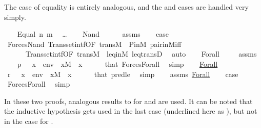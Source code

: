The case of equality is entirely analogous, and the  and
 cases are handled very simply.
%
\begin{isabelle}
\isamarkupfalse%
\isanewline
\ \ \isamarkupfalse%
\ {\isacharparenleft}Equal\ n\ m{\isacharparenright}\isanewline
\ \ \dots\isanewline
{}\isamarkupfalse%
\isanewline
\ \ \isamarkupfalse%
\ {\isacharparenleft}Nand\ {\isasymphi}\ {\isasympsi}{\isacharparenright}\isanewline
\ \ \isamarkupfalse%
\ assms\isanewline
\ \ \isamarkupfalse%
\ {\isacharquery}case\ \isanewline
\ \ \ \ \isamarkupfalse%
\ Forces{\isacharunderscore}Nand\ Transset{\isacharunderscore}intf{\isacharbrackleft}OF\ trans{\isacharunderscore}M\ {\isacharunderscore}\ P{\isacharunderscore}in{\isacharunderscore}M{\isacharbrackright}\ pair{\isacharunderscore}in{\isacharunderscore}M{\isacharunderscore}iff\isanewline
\ \ \ \ \ \ Transset{\isacharunderscore}intf{\isacharbrackleft}OF\ trans{\isacharunderscore}M\ {\isacharunderscore}\ leq{\isacharunderscore}in{\isacharunderscore}M{\isacharbrackright}\ leq{\isacharunderscore}transD\ \isamarkupfalse%
\ auto\isanewline
{}\isamarkupfalse%
\isanewline
\ \ \isamarkupfalse%
\ {\isacharparenleft}Forall\ {\isasymphi}{\isacharparenright}\isanewline
\ \ \isamarkupfalse%
\ assms\isanewline
\ \ \isamarkupfalse%
\ {\isachardoublequoteopen}p\ {\isasymtturnstile}\ {\isasymphi}\ {\isacharparenleft}{\isacharbrackleft}x{\isacharbrackright}\ {\isacharat}\ env{\isacharparenright}{\isachardoublequoteclose}\ \ {\isachardoublequoteopen}x{\isasymin}M{\isachardoublequoteclose}\ \ x\isanewline
\ \ \ \ \isamarkupfalse%
\ that\ Forces{\isacharunderscore}Forall\ \isamarkupfalse%
\ simp\isanewline
\ \ \isamarkupfalse%
\ \underline{Forall}\ \isanewline
\ \ \isamarkupfalse%
\ {\isachardoublequoteopen}r\ {\isasymtturnstile}\ {\isasymphi}\ {\isacharparenleft}{\isacharbrackleft}x{\isacharbrackright}\ {\isacharat}\ env{\isacharparenright}{\isachardoublequoteclose}\ \ {\isachardoublequoteopen}x{\isasymin}M{\isachardoublequoteclose}\ \ x\isanewline
\ \ \ \ \isamarkupfalse%
\ that\ pred{\isacharunderscore}le{}\ \isamarkupfalse%
\ {\isacharparenleft}simp{\isacharparenright}\isanewline
\ \ \isamarkupfalse%
\ assms\ \underline{Forall}\isanewline
\ \ \isamarkupfalse%
\ {\isacharquery}case\ \isanewline
\ \ \ \ \isamarkupfalse%
\ Forces{\isacharunderscore}Forall\ \isamarkupfalse%
\ simp\isanewline
{}\isamarkupfalse
\end{isabelle}
%
In these two proofs, analogous results to
 for  and
 are used. It can be noted that the inductive hypothesis
gets used in the last case (underlined here as
), but not in the case for .

